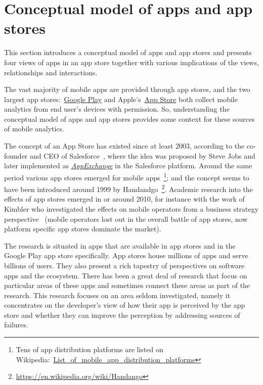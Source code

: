 \section{Conceptual model of apps and app stores}
This section introduces a conceptual model of apps and app stores and presents four views of apps in an app store together with various implications of the views, relationships and interactions. 

The vast majority of mobile apps are provided through app stores, and the two largest app stores:~\href{https://play.google.com/store/apps}{Google Play} and Apple's~\href{https://www.apple.com/app-store/}{App Store} both collect mobile analytics from end user's devices with permission. So, understanding the conceptual model of apps and app stores provides some context for these sources of mobile analytics. 

The concept of an App Store has existed since at least 2003, according to the co-founder and CEO of Salesforce~\cite{benioff_trailblazer_2019}, where the idea was proposed by Steve Jobs and later implemented as \href{https://appexchange.salesforce.com/}{\emph{AppExchange}} in the Salesforce platform. Around the same period various app stores emerged for mobile apps~\footnote{Tens of app distribution platforms are listed on Wikipedia:~\href{https://en.wikipedia.org/wiki/List_of_mobile_app_distribution_platforms}{List\_of\_mobile\_app\_distribution\_platforms}}; and the concept seems to have been introduced around 1999 by Handandgo~\footnote{\url{https://en.wikipedia.org/wiki/Handango}}. Academic research into the effects of app stores emerged in or around 2010, for instance with the work of Kimbler who investigated the effects on mobile operators from a business strategy perspective~\cite{kimbler_app_store_strategies_2010} (mobile operators lost out in the overall battle of app stores, now platform specific app stores dominate the market). 

The research is situated in apps that are available in app stores and in the Google Play app store specifically. App stores house millions of apps and serve billions of users. They also present a rich tapestry of perspectives on software apps and the ecosystem. There has been a great deal of research that focus on particular areas of these apps and sometimes connect these areas as part of the research. This research focuses on an area seldom investigated, namely it concentrates on the developer's view of how their app is perceived by the app store and whether they can improve the perception by addressing sources of failures.

